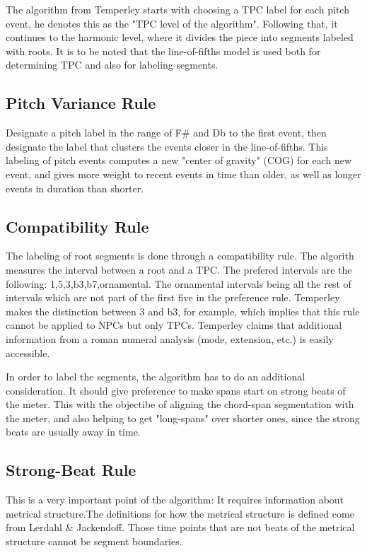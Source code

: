\begin{itemize}
			The algorithm from Temperley starts with choosing a TPC label for each pitch event, he denotes this as the "TPC level of the algorithm". Following that, it continues to the harmonic level, where it divides the piece into segments labeled with roots. It is to be noted that the line-of-fifths model is used both for determining TPC and also for labeling segments.
		\end{itemize}

		\subsection{Pitch Variance Rule}
		Designate a pitch label in the range of F\# and Db to the first event, then designate the label that clusters the events closer in the line-of-fifths. This labeling of pitch events computes a new "center of gravity" (COG) for each new event, and gives more weight to recent events in time than older, as well as longer events in duration than shorter.

		\subsection{Compatibility Rule}
		The labeling of root segments is done through a compatibility rule. The algorith measures the interval between a root and a TPC. The prefered intervals are the following: 1,5,3,b3,b7,ornamental. The ornamental intervals being all the rest of intervals which are not part of the first five in the preference rule. Temperley makes the distinction between 3 and b3, for example, which implies that this rule cannot be applied to NPCs but only TPCs. Temperley claims that additional information from a roman numeral analysis (mode, extension, etc.) is easily accessible.

		In order to label the segments, the algorithm has to do an additional consideration. It should give preference to make spans start on strong beats of the meter. This with the objectibe of aligning the chord-span segmentation with the meter, and also helping to get "long-spans" over shorter ones, since the strong beats are usually away in time.

		\subsection{Strong-Beat Rule}
		This is a very important point of the algorithm: It requires information about metrical structure.The definitions for how the metrical structure is defined come from Lerdahl \& Jackendoff. Those time points that are not beats of the metrical structure cannot be segment boundaries.

